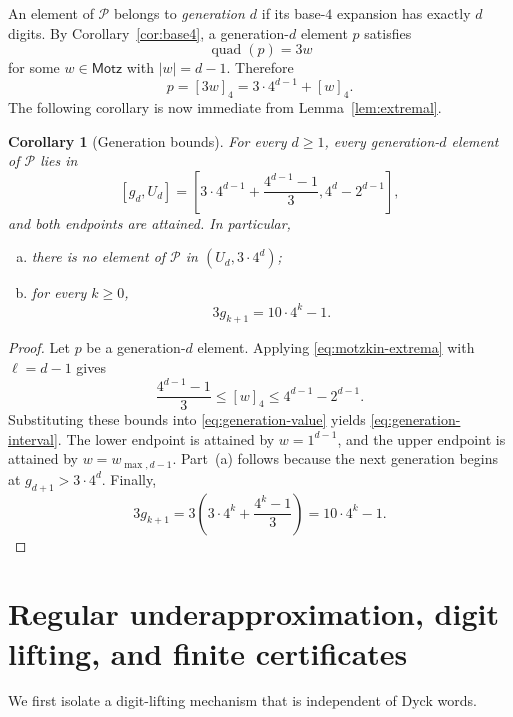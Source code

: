 \documentclass[11pt]{article}
\theoremstyle{plain}
\newtheorem{corollary}[theorem]{Corollary}
\theoremstyle{definition}
\newcommand{\Pset}{\mathcal P}
\begin{document}
An element of $\Pset$ belongs to \emph{generation $d$} if its base-$4$
expansion has exactly $d$ digits.  By Corollary~\ref{cor:base4}, a
generation-$d$ element $p$ satisfies
\[
 \operatorname{quad}(p)=3w
\]
for some $w\in\mathsf{Motz}$ with $|w|=d-1$.  Therefore
\begin{equation}\label{eq:generation-value}
 p=[3w]_4=3\cdot4^{d-1}+[w]_4.
\end{equation}
The following corollary is now immediate from Lemma~\ref{lem:extremal}.

\begin{corollary}[Generation bounds]\label{cor:gen}
For every $d\geq1$, every generation-$d$ element of $\Pset$ lies in
\begin{equation}\label{eq:generation-interval}
  [g_d,U_d]
  =\left[
  3\cdot4^{d-1}+\frac{4^{d-1}-1}{3},
  4^d-2^{d-1}
  \right],
\end{equation}
and both endpoints are attained.  In particular,
\begin{enumerate}[(a)]
\item there is no element of $\Pset$ in $(U_d,3\cdot4^d)$;
\item for every $k\geq0$,
\begin{equation}\label{eq:three-g}
  3g_{k+1}=10\cdot4^k-1.
\end{equation}
\end{enumerate}
\end{corollary}

\begin{proof}
Let $p$ be a generation-$d$ element.  Applying
\eqref{eq:motzkin-extrema} with $\ell=d-1$ gives
\[
 \frac{4^{d-1}-1}{3}
 \leq[w]_4
 \leq4^{d-1}-2^{d-1}.
\]
Substituting these bounds into \eqref{eq:generation-value} yields
\eqref{eq:generation-interval}.  The lower
endpoint is attained by $w=1^{d-1}$, and the upper endpoint is attained by
$w=w_{\max,d-1}$.  Part~(a) follows because the next generation begins at
$g_{d+1}>3\cdot4^d$.  Finally,
\[
  3g_{k+1}
  =3\left(3\cdot4^k+\frac{4^k-1}{3}\right)
  =10\cdot4^k-1.
\]
\end{proof}

\section{Regular underapproximation, digit lifting, and finite certificates}
\label{sec:lifting}

We first isolate a digit-lifting mechanism that is independent of Dyck
words.
\end{document}
